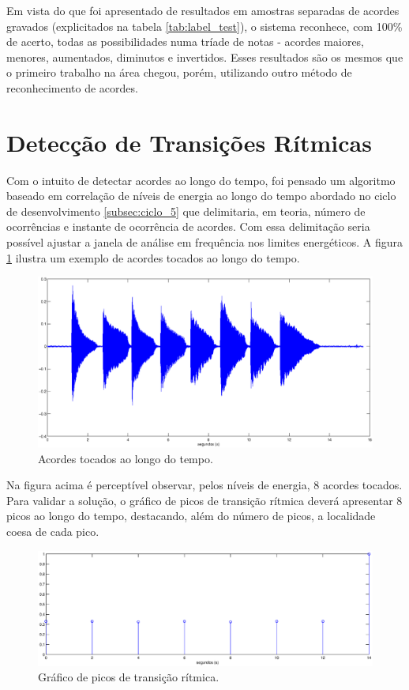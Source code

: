 \newpage
Em vista do que foi apresentado de resultados em amostras separadas de acordes gravados (explicitados na tabela \ref{tab:label_test}), o sistema reconhece, com 100\% de acerto, todas as possibilidades numa tríade de notas - acordes maiores, menores, aumentados, diminutos e invertidos. Esses resultados são os mesmos que o primeiro trabalho na área \cite{fujishima1999realtime} chegou, porém, utilizando outro método de reconhecimento de acordes.

\section{Detecção de Transições Rítmicas}
\label{sec:ritmica}

Com o intuito de detectar acordes ao longo do tempo, foi pensado um algoritmo baseado em correlação de níveis de energia ao longo do tempo abordado no ciclo de desenvolvimento \ref{subsec:ciclo_5} que delimitaria, em teoria, número de ocorrências e instante de ocorrência de acordes. Com essa delimitação seria possível ajustar a janela de análise em frequência nos limites energéticos. A figura \ref{fig:deteccao_ritmica_1} ilustra um exemplo de acordes tocados ao longo do tempo. 

\begin{figure}[h]
    \centering
    \includegraphics[keepaspectratio=true,scale=0.45]{figuras/deteccao_ritmica_1.eps}
  \caption{Acordes tocados ao longo do tempo.}
  \label{fig:deteccao_ritmica_1}
\end{figure}

Na figura acima é perceptível observar, pelos níveis de energia, 8 acordes tocados. Para validar a solução, o gráfico de picos de transição rítmica deverá apresentar 8 picos ao longo do tempo, destacando, além do número de picos, a localidade coesa de cada pico.

\begin{figure}[h]
    \centering
    \includegraphics[keepaspectratio=true,scale=0.45]{figuras/deteccao_ritmica_2.eps}
  \caption{Gráfico de picos de transição rítmica.}
  \label{fig:deteccao_ritmica_2}
\end{figure}

